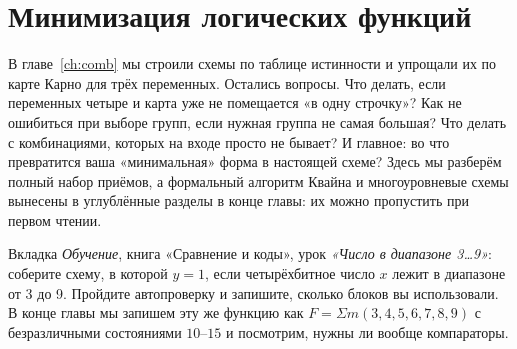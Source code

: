 \chapter{Минимизация логических функций}
\label{ch:minimize}

\providecommand{\kmapfour}[1]{%
  \foreach \kc/\klab in {0/00, 1/01, 2/11, 3/10} \node[font=\sffamily\small] at (\kc,0.85) {\klab};
  \foreach \kr/\klab in {0/00, 1/01, 2/11, 3/10} \node[font=\sffamily\small] at (-0.95,-\kr) {\klab};
  \node[font=\sffamily\small] at (-1.2,0.85) {$AB\backslash CD$};
  \foreach \kv [count=\ki from 0] in {#1} {%
    \pgfmathtruncatemacro{\kr}{int(\ki/4)}%
    \pgfmathtruncatemacro{\kc}{mod(\ki,4)}%
    \def\kfill{white}%
    \if 1\kv \def\kfill{FpgaLight}\fi
    \if x\kv \def\kfill{gray!25}\fi
    \node[draw, minimum size=10mm, font=\sffamily\large, fill=\kfill] at (\kc,-\kr) {\if x\kv$\times$\else\kv\fi};
    \node[font=\sffamily\footnotesize, text=gray, anchor=south east, inner sep=1pt] at (\kc+0.48,-\kr-0.48) {\ifcase\ki\relax 0\or 1\or 3\or 2\or 4\or 5\or 7\or 6\or 12\or 13\or 15\or 14\or 8\or 9\or 11\else 10\fi};
  }}
\providecommand{\kgrp}[6]{\draw[very thick, #1, rounded corners=4pt]
  (#2-#6,-#3+#6) rectangle (#4+#6,-#5-#6);}

В главе~\ref{ch:comb} мы строили схемы по таблице истинности и упрощали их по
карте Карно для трёх переменных. Остались вопросы. Что делать, если
переменных четыре и карта уже не помещается «в одну строчку»? Как не
ошибиться при выборе групп, если нужная группа не самая большая? Что делать с
комбинациями, которых на входе просто не бывает? И главное: во что
превратится ваша «минимальная» форма в настоящей схеме? Здесь мы разберём
полный набор приёмов, а формальный алгоритм Квайна и многоуровневые схемы
вынесены в углублённые разделы в конце главы: их можно пропустить при
первом чтении.

\begin{buildbox}
Вкладка \emph{Обучение}, книга «Сравнение и коды», урок \emph{«Число в
диапазоне 3\ldots 9»}: соберите схему, в которой $y=1$, если четырёхбитное
число $x$ лежит в диапазоне от 3 до 9. Пройдите автопроверку и запишите,
сколько блоков вы использовали. В конце главы мы запишем эту же функцию как
$F=\Sigma m(3,4,5,6,7,8,9)$ с безразличными состояниями $10$--$15$ и
посмотрим, нужны ли вообще компараторы.
\end{buildbox}

